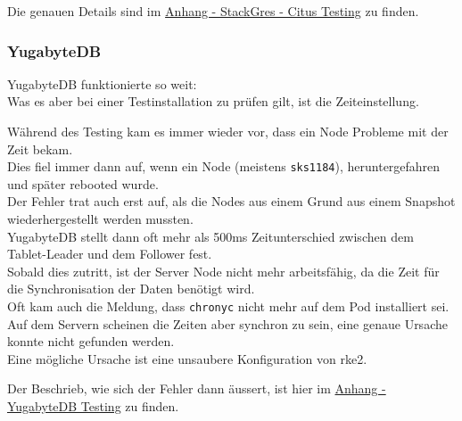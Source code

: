 \begin{flushleft}
    
    Die genauen Details sind im \hyperref[subsec:appendix_testing_stackgres_citus]{Anhang - StackGres - Citus Testing} zu finden.
\end{flushleft}
\begin{flushleft}
    \subsubsection{YugabyteDB}
    YugabyteDB funktionierte so weit:\\
    
    Was es aber bei einer Testinstallation zu prüfen gilt, ist die Zeiteinstellung.
\end{flushleft}
\begin{flushleft}
    Während des Testing kam es immer wieder vor, dass ein Node Probleme mit der Zeit bekam.\\
    Dies fiel immer dann auf, wenn ein Node (meistens \texttt{sks1184}), heruntergefahren und später rebooted wurde.\\
    Der Fehler trat auch erst auf, als die Nodes aus einem Grund aus einem Snapshot wiederhergestellt werden mussten.\\
    YugabyteDB stellt dann oft mehr als 500ms Zeitunterschied zwischen dem Tablet-Leader und dem Follower fest.\\
    Sobald dies zutritt, ist der Server Node nicht mehr arbeitsfähig, da die Zeit für die Synchronisation der Daten benötigt wird\cite{BYH9Z3MS}.\\
    Oft kam auch die Meldung, dass \texttt{chronyc} nicht mehr auf dem Pod installiert sei.\\
    Auf dem Servern scheinen die Zeiten aber synchron zu sein, eine genaue Ursache konnte nicht gefunden werden.\\
    Eine mögliche Ursache ist eine unsaubere Konfiguration von \gls{rke2}.
\end{flushleft}
\begin{flushleft}
    Der Beschrieb, wie sich der Fehler dann äussert, ist hier im \hyperref[subsec:appendix_testing_yugabytedb]{Anhang - YugabyteDB Testing} zu finden.
\end{flushleft}